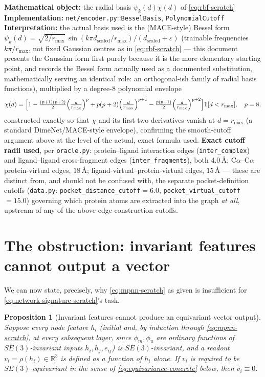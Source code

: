 \documentclass[11pt,a4paper]{report}
\newtheorem{proposition}[proposition]{Proposition}
\theoremstyle{definition}
\theoremstyle{remark}
\newcommand{\RR}{\mathbb R}
\newcommand{\ind}{\mathbf 1}
\newcommand{\eps}{\varepsilon}
\newcommand{\file}[1]{\texttt{#1}}
\newcommand{\pyfunc}[1]{\texttt{#1}}
\begin{document}
\begin{codebox}
\textbf{Mathematical object:} the radial basis $\psi_k(d)\chi(d)$ of
\eqref{eq:rbf-scratch} \\
\textbf{Implementation:} \file{net/encoder.py}::\pyfunc{BesselBasis},
\pyfunc{PolynomialCutoff} \\
\textbf{Interpretation:} the actual basis used is the (MACE-style) Bessel
form $\psi_k(d)=\sqrt{2/r_{\max}}\,\sin(k\pi d_{\mathrm{scaled}}/r_{\max})/(d_{\mathrm{scaled}}+\eps)$
(trainable frequencies $k\pi/r_{\max}$, not fixed Gaussian centres as in
\eqref{eq:rbf-scratch} --- this document presents the Gaussian form first
purely because it is the more elementary starting point, and records the
Bessel form actually used as a documented substitution, mathematically
serving an identical role: an orthogonal-ish family of radial basis
functions), multiplied by a degree-$8$ polynomial envelope
\[
\chi(d) = \Bigl[1-\tfrac{(p+1)(p+2)}2\Bigl(\tfrac d{r_{\max}}\Bigr)^p
+p(p+2)\Bigl(\tfrac d{r_{\max}}\Bigr)^{p+1}-\tfrac{p(p+1)}2\Bigl(\tfrac d{r_{\max}}\Bigr)^{p+2}\Bigr]\ind[d<r_{\max}],
\quad p=8,
\]
constructed exactly so that $\chi$ and its first two derivatives vanish at
$d=r_{\max}$ (a standard DimeNet/MACE-style envelope), confirming the
smooth-cutoff argument above at the level of the actual, exact formula
used. \textbf{Exact cutoff radii used}, per \file{oracle.py}: protein--ligand
interaction edges (\texttt{inter\_complex}) and ligand--ligand
cross-fragment edges (\texttt{inter\_fragments}), both $4.0\,$\r A;
C$\alpha$--C$\alpha$ protein-virtual edges, $18\,$\r A; ligand-virtual--protein-virtual
edges, $15\,$\r A --- these are distinct from, and should not be confused
with, the separate pocket-definition cutoffs
(\file{data.py}: \texttt{pocket\_distance\_cutoff}$=6.0$,
\texttt{pocket\_virtual\_cutoff}$=15.0$) governing which protein atoms are
extracted into the graph \emph{at all}, upstream of any of the above
edge-construction cutoffs.
\end{codebox}

\section{The obstruction: invariant features cannot output a vector}
\label{sec:invariance-obstruction}

We can now state, precisely, why \eqref{eq:mpnn-scratch} as given is
insufficient for \eqref{eq:network-signature-scratch}'s task.

\begin{proposition}[Invariant features cannot produce an equivariant vector output]
\label{prop:invariance-obstruction-scratch}
Suppose every node feature $h_i$ (initial and, by induction through
\eqref{eq:mpnn-scratch}, at every subsequent layer, since $\phi_m,\phi_u$
are ordinary functions of $SE(3)$-invariant inputs $h_i,h_j,e_{ij}$) is
$SE(3)$-invariant, and a readout $v_i=\rho(h_i)\in\RR^3$ is defined as a
function of $h_i$ alone. If $v_i$ is required to be $SE(3)$-equivariant in
the sense of \eqref{eq:equivariance-concrete} below, then $v_i\equiv0$.
\end{proposition}
\end{document}
